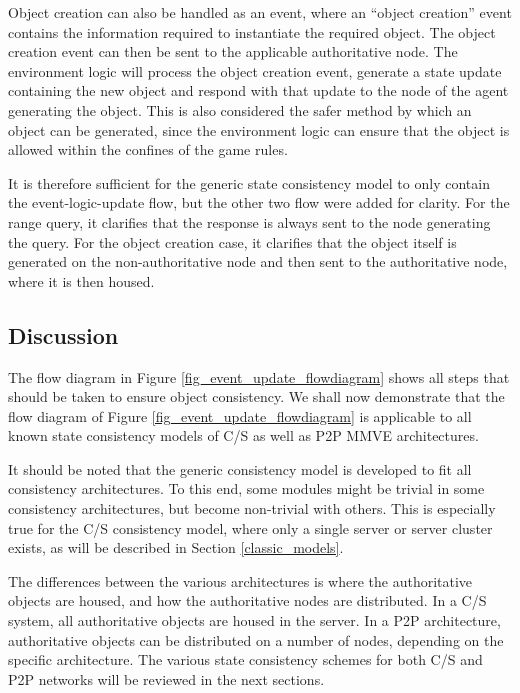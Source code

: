 Object creation can also be handled as an event, where an ``object creation'' event contains the information required to instantiate the required object. The object creation event can then be sent to the applicable authoritative node. The environment logic will process the object creation event, generate a state update containing the new object and respond with that update to the node of the agent generating the object. This is also considered the safer method by which an object can be generated, since the environment logic can ensure that the object is allowed within the confines of the game rules.

It is therefore sufficient for the generic state consistency model to only contain the event-logic-update flow, but the other two flow were added for clarity. For the range query, it clarifies that the response is always sent to the node generating the query. For the object creation case, it clarifies that the object itself is generated on the non-authoritative node and then sent to the authoritative node, where it is then housed.

\subsection{Discussion}

The flow diagram in Figure \ref{fig_event_update_flowdiagram} shows all steps that should be taken to ensure object consistency. We shall now demonstrate that the flow diagram of Figure \ref{fig_event_update_flowdiagram} is applicable to all known state consistency models of C/S as well as P2P MMVE architectures.

It should be noted that the generic consistency model is developed to fit all consistency architectures. To this end, some modules might be trivial in some consistency architectures, but become non-trivial with others. This is especially true for the C/S consistency model, where only a single server or server cluster exists, as will be described in Section \ref{classic_models}.

The differences between  the various architectures is where the authoritative objects are  housed, and how the authoritative nodes are distributed. In a C/S system, all authoritative objects are housed in the server. In a P2P architecture, authoritative objects can be distributed on a number of nodes, depending on the specific architecture. The various state consistency schemes for both C/S and P2P networks will be reviewed in the next sections.


